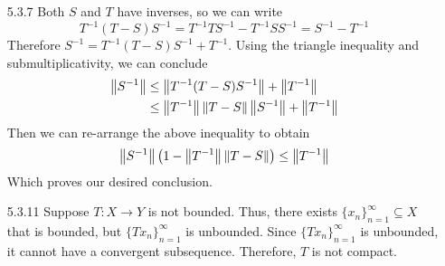 \documentclass[../../Solutions.tex]{subfiles}
\begin{document}
\begin{itemize}
	\item [5.3.7] Both $S$ and $T$ have inverses, so we can write
		$$ T^{-1}(T-S)S^{-1} = T^{-1}TS^{-1} - T^{-1}SS^{-1} = S^{-1} - T^{-1} $$
		Therefore $S^{-1} = T^{-1}(T-S)S^{-1} + T^{-1}$.
		Using the triangle inequality and submultiplicativity, we can conclude
		\begin{align*}
			\left\lVert S^{-1}\right\rVert &\leq \left\lVert T^{-1}(T-S)S^{-1}\right\rVert + \left\lVert T^{-1}\right\rVert \\
				&\leq \left\lVert T^{-1}\right\rVert\left\lVert T-S\right\rVert\left\lVert S^{-1}\right\rVert + \left\lVert T^{-1}\right\rVert
		\end{align*}
		Then we can re-arrange the above inequality to obtain
		\begin{equation*}
			\left\lVert S^{-1}\right\rVert\left(1-\left\lVert T^{-1}\right\rVert\left\lVert T-S\right\rVert\right) \leq \left\lVert T^{-1}\right\rVert
		\end{equation*}
		Which proves our desired conclusion.
	
	\item [5.3.11] Suppose $T:X\to Y$ is not bounded.
		Thus, there exists $\{x_n\}_{n=1}^\infty \subseteq X$ that is bounded, but $\{Tx_n\}_{n=1}^\infty$ is unbounded.
		Since $\{Tx_n\}_{n=1}^\infty$ is unbounded, it cannot have a convergent subsequence.
		Therefore, $T$ is not compact.
	

\end{itemize}
\end{document}

